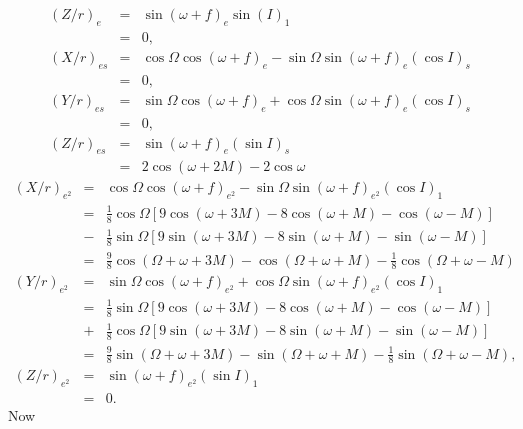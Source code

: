 \documentclass [12pt, a4paper] {article}
\begin{document}
\begin {eqnarray}
    \\
    (Z/r)_{e} &=&
    \sin(\omega + f)_e\sin(I)_1
    \\
    &=& 0,
    \\
    (X/r)_{es} &=& \cos\Omega\cos(\omega + f)_e - \sin\Omega\sin(\omega + f)_e(\cos I)_s 
    \\
    &=& 0,
    \\
    (Y/r)_{es} &=& \sin\Omega\cos(\omega + f)_e + \cos\Omega\sin(\omega + f)_e(\cos I)_s
    \\
    &=& 0,
    \\
    (Z/r)_{es} &=& \sin(\omega + f)_e(\sin I)_s
    \\
    &=& 2 \cos(\omega + 2M) - 2\cos\omega
\end {eqnarray}
\begin {eqnarray}
    (X/r)_{e^2} &=& \cos\Omega\cos(\omega + f)_{e^2} - \sin\Omega\sin(\omega + f)_{e^2}(\cos I)_1
    \\
    &=& \frac{1}{8}\cos\Omega
    \left[
        9\cos(\omega + 3M) - 8 \cos(\omega + M) - \cos(\omega - M)
    \right]
    \\\nonumber 
    &-&
    \frac{1}{8}\sin\Omega
    \left[
         9\sin(\omega + 3M) - 8\sin(\omega + M) - \sin(\omega - M)
    \right]    
    \\
    &=& 
    \frac{9}{8}\cos(\Omega + \omega + 3M)
    -
    \cos(\Omega + \omega + M)
    - 
    \frac{1}{8}\cos(\Omega + \omega - M)
    \\
    (Y/r)_{e^2} &=&\sin\Omega\cos(\omega + f)_{e^2} + \cos\Omega\sin(\omega + f)_{e^2}(\cos I)_1
    \\
    &=&
    \frac{1}{8}\sin\Omega
    \left[
        9\cos(\omega + 3M) - 8 \cos(\omega + M) - \cos(\omega - M)
    \right]
    \\\nonumber 
    &+&
    \frac{1}{8}\cos\Omega 
    \left[
         9\sin(\omega + 3M) - 8\sin(\omega + M) - \sin(\omega - M)
    \right]    
    \\
    &=& 
    \frac{9}{8}\sin(\Omega + \omega + 3M)
    -
    \sin(\Omega + \omega + M)
    -
    \frac{1}{8}\sin(\Omega + \omega - M),
    \\
    (Z/r)_{e^2} &=& \sin(\omega + f)_{e^2}(\sin I)_1
    \\
    &=& 0.
\end {eqnarray}
Now
\end{document}
